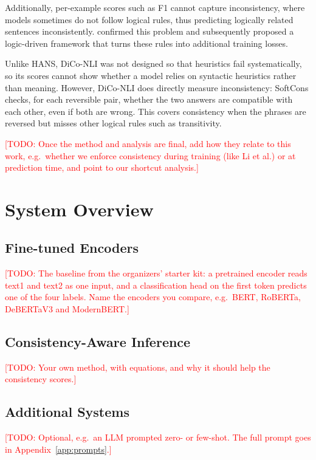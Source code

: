 \documentclass[11pt]{article}
\newcommand{\todo}[1]{\textcolor{red}{[TODO: #1]}}
\begin{document}
Additionally, per-example scores such as F1 cannot capture inconsistency, where models sometimes do not follow logical rules, thus predicting logically related sentences inconsistently. \citet{li-etal-2019-logic} confirmed this problem and subsequently proposed a logic-driven framework that turns these rules into additional training losses.

Unlike HANS, DiCo-NLI was not designed so that heuristics fail systematically, so its scores cannot show whether a model relies on syntactic heuristics rather than meaning. However, DiCo-NLI does directly measure inconsistency: SoftCons checks, for each reversible pair, whether the two answers are compatible with each other, even if both are wrong. This covers consistency when the phrases are reversed but misses other logical rules such as transitivity.

\todo{Once the method and analysis are final, add how they relate to this work, e.g.\ whether we enforce consistency during training (like Li et al.) or at prediction time, and point to our shortcut analysis.}

\section{System Overview}

\subsection{Fine-tuned Encoders}
\todo{The baseline from the organizers' starter kit: a pretrained encoder reads text1 and text2 as one input, and a classification head on the first token predicts one of the four labels. Name the encoders you compare, e.g.\ BERT, RoBERTa, DeBERTaV3 and ModernBERT.}

\subsection{Consistency-Aware Inference}
\todo{Your own method, with equations, and why it should help the consistency scores.}

\subsection{Additional Systems}
\todo{Optional, e.g.\ an LLM prompted zero- or few-shot. The full prompt goes in Appendix~\ref{app:prompts}.}
\end{document}
